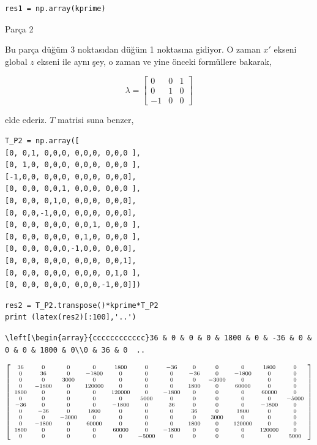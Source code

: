 \documentclass[12pt,fleqn]{article}\usepackage{../../common}
\begin{document}
\begin{verbatim}
res1 = np.array(kprime)
\end{verbatim}

Parça 2

Bu parça düğüm 3 noktasıdan düğüm 1 noktasına gidiyor. O zaman $x'$ ekseni
global $z$ ekseni ile aynı şey, o zaman ve yine önceki formüllere bakarak,

$$
\lambda = \left[\begin{array}{ccc}
0 & 0 & 1 \\ 0 & 1 & 0 \\ -1 & 0 & 0
\end{array}\right]
$$

elde ederiz. $T$ matrisi suna benzer,

\begin{verbatim}
T_P2 = np.array([
[0, 0,1, 0,0,0, 0,0,0, 0,0,0 ],
[0, 1,0, 0,0,0, 0,0,0, 0,0,0 ],
[-1,0,0, 0,0,0, 0,0,0, 0,0,0],
[0, 0,0, 0,0,1, 0,0,0, 0,0,0 ],
[0, 0,0, 0,1,0, 0,0,0, 0,0,0],
[0, 0,0,-1,0,0, 0,0,0, 0,0,0],
[0, 0,0, 0,0,0, 0,0,1, 0,0,0 ],
[0, 0,0, 0,0,0, 0,1,0, 0,0,0 ],
[0, 0,0, 0,0,0,-1,0,0, 0,0,0],
[0, 0,0, 0,0,0, 0,0,0, 0,0,1],
[0, 0,0, 0,0,0, 0,0,0, 0,1,0 ],
[0, 0,0, 0,0,0, 0,0,0,-1,0,0]])
\end{verbatim}

\begin{verbatim}
res2 = T_P2.transpose()*kprime*T_P2
print (latex(res2)[:100],'..')
\end{verbatim}

\begin{verbatim}
\left[\begin{array}{cccccccccccc}36 & 0 & 0 & 0 & 1800 & 0 & -36 & 0 & 0 & 0 & 1800 & 0\\0 & 36 & 0  ..
\end{verbatim}

$$
\scriptsize
\left[\begin{array}{cccccccccccc}36 & 0 & 0 & 0 & 1800 & 0 & -36 & 0 & 0 & 0 &
    1800 & 0\\0 & 36 & 0 & -1800 & 0 & 0 & 0 & -36 & 0 & -1800 & 0 & 0\\0 & 0 &
    3000 & 0 & 0 & 0 & 0 & 0 & -3000 & 0 & 0 & 0\\0 & -1800 & 0 & 120000 & 0 & 0
    & 0 & 1800 & 0 & 60000 & 0 & 0\\1800 & 0 & 0 & 0 & 120000 & 0 & -1800 & 0 &
    0 & 0 & 60000 & 0\\0 & 0 & 0 & 0 & 0 & 5000 & 0 & 0 & 0 & 0 & 0 & -5000\\-36
    & 0 & 0 & 0 & -1800 & 0 & 36 & 0 & 0 & 0 & -1800 & 0\\0 & -36 & 0 & 1800 & 0
    & 0 & 0 & 36 & 0 & 1800 & 0 & 0\\0 & 0 & -3000 & 0 & 0 & 0 & 0 & 0 & 3000 &
    0 & 0 & 0\\0 & -1800 & 0 & 60000 & 0 & 0 & 0 & 1800 & 0 & 120000 & 0 &
    0\\1800 & 0 & 0 & 0 & 60000 & 0 & -1800 & 0 & 0 & 0 & 120000 & 0\\0 & 0 & 0
    & 0 & 0 & -5000 & 0 & 0 & 0 & 0 & 0 & 5000\end{array}\right]
$$
\end{document}
